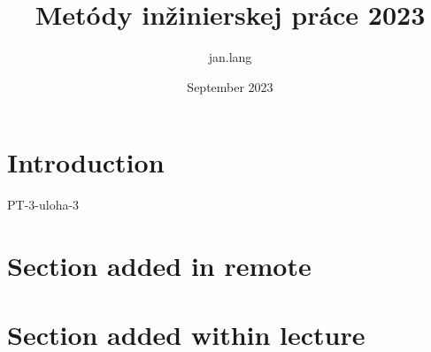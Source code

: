 \documentclass{article}
\title{Metódy inžinierskej práce 2023}
\author{jan.lang }
\date{September 2023}
\begin{document}
\maketitle

\section{Introduction}

PT-3-uloha-3


\section{Section added in remote}

\section{Section added within lecture}

\Blinddocument
\end{document}
